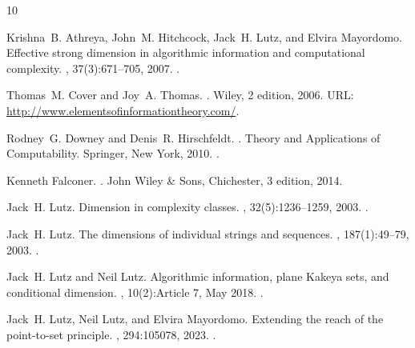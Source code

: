 \documentclass[a4paper,oneside,reqno,12pt]{amsart}
\theoremstyle{plain}
\theoremstyle{definition}
\theoremstyle{remark}
\begin{document}
\begin{thebibliography}{10}

Krishna~B. Athreya, John~M. Hitchcock, Jack~H. Lutz, and Elvira Mayordomo.
\newblock Effective strong dimension in algorithmic information and computational complexity.
, 37(3):671--705, 2007.
\newblock \href {https://doi.org/10.1137/S0097539703446912} {}.

Thomas~M. Cover and Joy~A. Thomas.
.
\newblock Wiley, 2 edition, 2006.
\newblock URL: \url{http://www.elementsofinformationtheory.com/}.

Rodney~G. Downey and Denis~R. Hirschfeldt.
.
\newblock Theory and Applications of Computability. Springer, New York, 2010.
\newblock \href {https://doi.org/10.1007/978-0-387-68441-3} {}.

Kenneth Falconer.
.
\newblock John Wiley \& Sons, Chichester, 3 edition, 2014.

Jack~H. Lutz.
\newblock Dimension in complexity classes.
, 32(5):1236--1259, 2003.
\newblock \href {https://doi.org/10.1137/S0097539701417723} {}.

Jack~H. Lutz.
\newblock The dimensions of individual strings and sequences.
, 187(1):49--79, 2003.
\newblock \href {https://doi.org/10.1016/S0890-5401(03)00187-1} {}.

Jack~H. Lutz and Neil Lutz.
\newblock Algorithmic information, plane {Kakeya} sets, and conditional dimension.
, 10(2):Article 7, May 2018.
\newblock \href {https://doi.org/10.1145/3201783} {}.

Jack~H. Lutz, Neil Lutz, and Elvira Mayordomo.
\newblock Extending the reach of the point-to-set principle.
, 294:105078, 2023.
\newblock \href {https://doi.org/10.1016/j.ic.2023.105078} {}.


\end{thebibliography}
\end{document}
